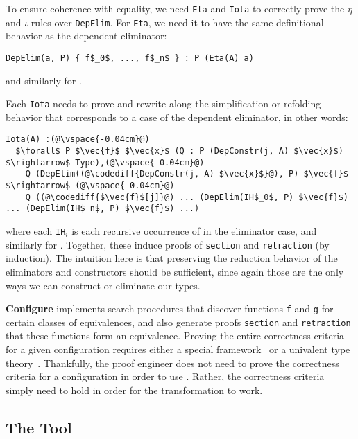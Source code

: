 To ensure coherence with equality, we need \lstinline{Eta} and \lstinline{Iota} to correctly prove the $\eta$ and $\iota$ rules
over \lstinline{DepElim}.
For \lstinline{Eta}, we need it to have the same definitional behavior as the dependent eliminator:

\begin{lstlisting}
DepElim(a, P) { f$_0$, ..., f$_n$ } : P (Eta(A) a)
\end{lstlisting}
and similarly for \B.

Each \lstinline{Iota} needs to prove and rewrite along the simplification or refolding behavior that corresponds to a case of the dependent eliminator, in other words: %

\begin{lstlisting}
Iota(A) :(@\vspace{-0.04cm}@)
  $\forall$ P $\vec{f}$ $\vec{x}$ (Q : P (DepConstr(j, A) $\vec{x}$) $\rightarrow$ Type),(@\vspace{-0.04cm}@)
    Q (DepElim((@\codediff{DepConstr(j, A) $\vec{x}$}@), P) $\vec{f}$ $\rightarrow$ (@\vspace{-0.04cm}@)
    Q ((@\codediff{$\vec{f}$[j]}@) ... (DepElim(IH$_0$, P) $\vec{f}$) ... (DepElim(IH$_n$, P) $\vec{f}$) ...)
\end{lstlisting}
where each \lstinline{IH}$_i$ is each recursive occurrence of \A in the eliminator case,
and similarly for \B.
Together, these induce proofs of \lstinline{section} and \lstinline{retraction} (by induction).
The intuition here is that preserving the reduction behavior
of the eliminators and constructors should be sufficient, since again those are the only ways we can construct or eliminate our types.

\textbf{Configure} implements search procedures that discover functions \lstinline{f} and \lstinline{g} for certain classes of
equivalences, and also
generate proofs \lstinline{section} and \lstinline{retraction} that these functions form an equivalence.
Proving the entire correctness criteria for a given configuration requires either a special framework~\cite{tabareau2017equivalences}
or a univalent type theory~\cite{univalent2013homotopy}.
Thankfully, the proof engineer does not need to prove the correctness criteria for a configuration in order to use \toolname.
Rather, the correctness criteria simply need to hold in order for the transformation to work.

\subsection{The Tool}
\label{sec:implementation}

